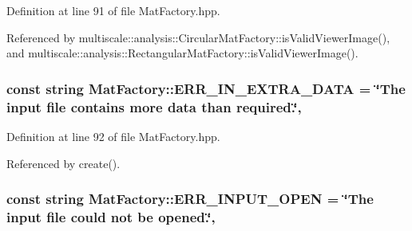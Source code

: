 Definition at line 91 of file Mat\-Factory.\-hpp.



Referenced by multiscale\-::analysis\-::\-Circular\-Mat\-Factory\-::is\-Valid\-Viewer\-Image(), and multiscale\-::analysis\-::\-Rectangular\-Mat\-Factory\-::is\-Valid\-Viewer\-Image().

\hypertarget{classmultiscale_1_1analysis_1_1MatFactory_a09459b632d5b01f184ce0f56245f5905}{
\subsubsection[{E\-R\-R\-\_\-\-I\-N\-\_\-\-E\-X\-T\-R\-A\-\_\-\-D\-A\-T\-A}]{\setlength{\rightskip}{0pt plus 5cm}const string Mat\-Factory\-::\-E\-R\-R\-\_\-\-I\-N\-\_\-\-E\-X\-T\-R\-A\-\_\-\-D\-A\-T\-A = \char`\"{}The input file contains more data than required.\char`\"{}\hspace{0.3cm}{\ttfamily [static]}, {\ttfamily [protected]}}}\label{classmultiscale_1_1analysis_1_1MatFactory_a09459b632d5b01f184ce0f56245f5905}


Definition at line 92 of file Mat\-Factory.\-hpp.



Referenced by create().

\hypertarget{classmultiscale_1_1analysis_1_1MatFactory_a06de250e466b41fcca4fa61a52a575fc}{
\subsubsection[{E\-R\-R\-\_\-\-I\-N\-P\-U\-T\-\_\-\-O\-P\-E\-N}]{\setlength{\rightskip}{0pt plus 5cm}const string Mat\-Factory\-::\-E\-R\-R\-\_\-\-I\-N\-P\-U\-T\-\_\-\-O\-P\-E\-N = \char`\"{}The input file could not be opened.\char`\"{}\hspace{0.3cm}{\ttfamily [static]}, {\ttfamily [protected]}}}\label{classmultiscale_1_1analysis_1_1MatFactory_a06de250e466b41fcca4fa61a52a575fc}



